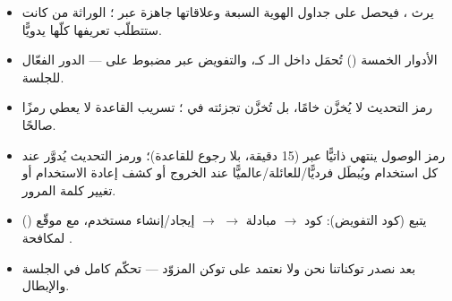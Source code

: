\begin{summary}
\begin{itemize}
\item {} يرث ، فيحصل على جداول الهوية السبعة وعلاقاتها جاهزة عبر
  ؛ الوراثة من  كانت ستتطلّب تعريفها كلّها يدويًّا.
\item الأدوار الخمسة ()
  تُحمَل داخل الـ كـ، والتفويض عبر \code{[Authorize(Roles=...)]}
  مضبوط على  — الدور الفعّال للجلسة.
\item رمز التحديث لا يُخزَّن خامًا، بل تُخزَّن تجزئته  في
  ؛ تسريب القاعدة لا يعطي رمزًا صالحًا.
\item رمز الوصول ينتهي ذاتيًّا عبر  (15 دقيقة، بلا رجوع للقاعدة)؛ ورمز
  التحديث يُدوَّر عند كل استخدام ويُبطَل فرديًّا/للعائلة/عالميًّا عند الخروج أو كشف
  إعادة الاستخدام أو تغيير كلمة المرور.
\item {} يتبع  (كود التفويض): كود $\rightarrow$ مبادلة
  $\rightarrow$  $\rightarrow$ إيجاد/إنشاء مستخدم، مع 
  موقّع () لمكافحة .
\item بعد  نصدر توكناتنا نحن ولا نعتمد على توكن المزوّد — تحكّم كامل في
  الجلسة والإبطال.
\end{itemize}
\end{summary}
